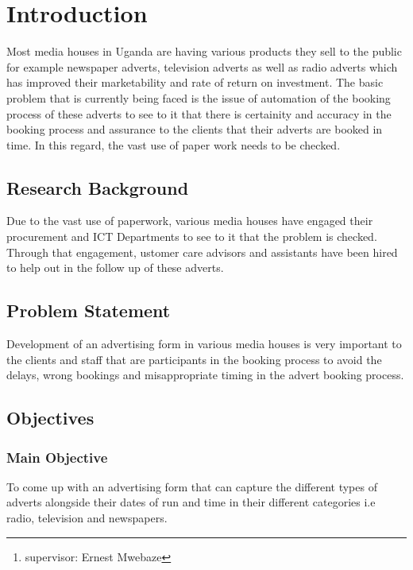 \documentclass[11pt,A4paper]{article}
\begin{document}
\author{Walugembe Martin Alvin (216005016, 16/U/12262/EVE) \thanks{supervisor: Ernest Mwebaze}}
\date{%
    Makerere University\\%
    Saturday 25th February, 2018
}







\section{\textbf{ Introduction}} 
Most media houses in Uganda are having various products they sell to the public for example newspaper adverts, television adverts as well as radio adverts which has improved their marketability and rate of return on investment.
The basic problem that is currently being faced is the issue of automation of the booking process of these adverts to see to it that there is certainity and accuracy in the booking process and assurance to the clients that their adverts are booked in time. In this regard, the vast use of paper work needs to be checked.\bigbreak
 
\subsection{\textbf{Research Background}}
Due to the vast use of paperwork, various media houses have engaged their procurement and ICT Departments to see to it that the problem is checked.
Through that engagement, ustomer care advisors and assistants have been hired to help out in the follow up of these adverts.
 

 \bigbreak



\subsection{\textbf{Problem Statement}}
Development of an advertising form in various media houses is very important to the clients and staff that are participants in the booking process to avoid the delays, wrong bookings and misappropriate timing in the advert booking process.

\subsection{\textbf{Objectives}}


\subsubsection{\textbf{Main Objective}} 
 To come up with an advertising form that can capture the different types of adverts alongside their dates of run and time in their different categories i.e radio, television and newspapers.
\end{document}

